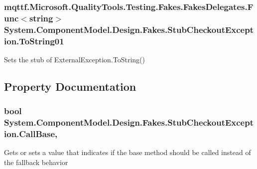 \hypertarget{class_system_1_1_component_model_1_1_design_1_1_fakes_1_1_stub_checkout_exception_aea0db28f0f306d2953b323a1206f2520}{
\subsubsection[{To\-String01}]{\setlength{\rightskip}{0pt plus 5cm}mqttf.\-Microsoft.\-Quality\-Tools.\-Testing.\-Fakes.\-Fakes\-Delegates.\-Func$<$string$>$ System.\-Component\-Model.\-Design.\-Fakes.\-Stub\-Checkout\-Exception.\-To\-String01}}\label{class_system_1_1_component_model_1_1_design_1_1_fakes_1_1_stub_checkout_exception_aea0db28f0f306d2953b323a1206f2520}


Sets the stub of External\-Exception.\-To\-String()



\subsection{Property Documentation}
\hypertarget{class_system_1_1_component_model_1_1_design_1_1_fakes_1_1_stub_checkout_exception_a53b062849ed61bd91a35f5b2c222f46b}{
\subsubsection[{Call\-Base}]{\setlength{\rightskip}{0pt plus 5cm}bool System.\-Component\-Model.\-Design.\-Fakes.\-Stub\-Checkout\-Exception.\-Call\-Base\hspace{0.3cm}{\ttfamily [get]}, {\ttfamily [set]}}}\label{class_system_1_1_component_model_1_1_design_1_1_fakes_1_1_stub_checkout_exception_a53b062849ed61bd91a35f5b2c222f46b}


Gets or sets a value that indicates if the base method should be called instead of the fallback behavior

